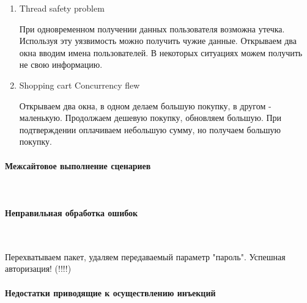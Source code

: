 \documentclass{article}
\begin{document}
\begin{enumerate}
\item Thread safety problem

При одновременном получении данных пользователя возможна утечка. Используя эту уязвимость можно получить чужие данные. Открываем два окна вводим имена пользователей. В некоторых ситуациях можем получить не свою информацию.

\item Shopping cart Concurrency flew

Открываем два окна, в одном делаем большую покупку, в другом - маленькую. Продолжаем дешевую покупку, обновляем большую. При подтверждении оплачиваем небольшую сумму, но получаем большую покупку.
\end{enumerate}

\paragraph{Межсайтовое выполнение сценариев}
~

\paragraph{Неправильная обработка ошибок}
~

Перехватываем пакет, удаляем передаваемый параметр "пароль". Успешная авторизация! (!!!!)

\paragraph{Недостатки приводящие к осуществлению инъекций}
~
\end{document}
